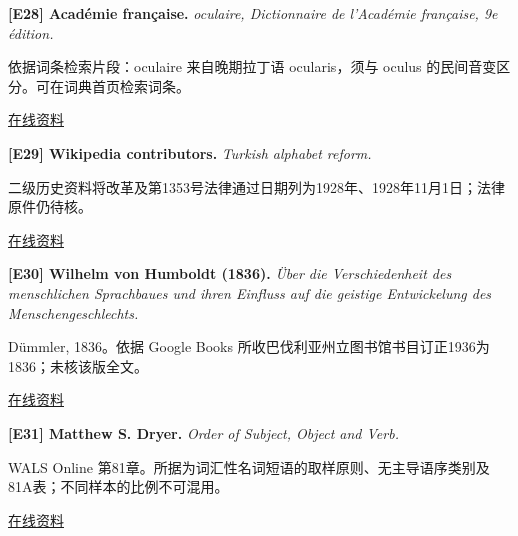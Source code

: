 \par\noindent\begin{minipage}{\linewidth}
\label{ref-28}\noindent\textbf{[E28] Académie française.} \textit{oculaire, Dictionnaire de l’Académie française, 9e édition.}\par\nobreak
依据词条检索片段：oculaire 来自晚期拉丁语 ocularis，须与 oculus 的民间音变区分。可在词典首页检索词条。\par
{\small\href{https://www.dictionnaire-academie.fr/}{在线资料}}\par
\par\end{minipage}\par

\par\noindent\begin{minipage}{\linewidth}
\label{ref-29}\noindent\textbf{[E29] Wikipedia contributors.} \textit{Turkish alphabet reform.}\par\nobreak
二级历史资料将改革及第1353号法律通过日期列为1928年、1928年11月1日；法律原件仍待核。\par
{\small\href{https://en.wikipedia.org/wiki/Turkish_alphabet_reform}{在线资料}}\par
\par\end{minipage}\par

\par\noindent\begin{minipage}{\linewidth}
\label{ref-30}\noindent\textbf{[E30] Wilhelm von Humboldt (1836).} \textit{Über die Verschiedenheit des menschlichen Sprachbaues und ihren Einfluss auf die geistige Entwickelung des Menschengeschlechts.}\par\nobreak
Dümmler, 1836。依据 Google Books 所收巴伐利亚州立图书馆书目订正1936为1836；未核该版全文。\par
{\small\href{https://books.google.com/books?id=NhBcAAAAcAAJ}{在线资料}}\par
\par\end{minipage}\par

\par\noindent\begin{minipage}{\linewidth}
\label{ref-31}\noindent\textbf{[E31] Matthew S. Dryer.} \textit{Order of Subject, Object and Verb.}\par\nobreak
WALS Online 第81章。所据为词汇性名词短语的取样原则、无主导语序类别及81A表；不同样本的比例不可混用。\par
{\small\href{https://wals.info/chapter/81}{在线资料}}\par
\par\end{minipage}\par


